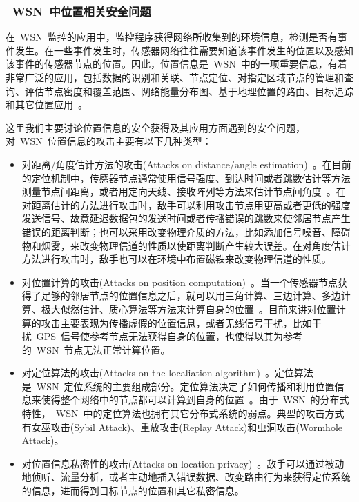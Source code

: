 \documentclass[a4paper,10pt]{article}
\begin{document}
\subsubsection{~WSN~中位置相关安全问题}  

在~WSN~监控的应用中，监控程序获得网络所收集到的环境信息，检测是否有事件发生。在一些事件发生时，传感器网络往往需要知道该事件发生的位置以及感知该事件的传感器节点的位置。因此，位置信息是~WSN~中的一项重要信息，有着非常广泛的应用，包括数据的识别和关联、节点定位、对指定区域节点的管理和查询、评估节点密度和覆盖范围、网络能量分布图、基于地理位置的路由、目标追踪和其它位置应用~\cite{Boukerche2007a,Yick2008}。

这里我们主要讨论位置信息的安全获得及其应用方面遇到的安全问题，对~WSN~位置信息的攻击主要有以下几种类型：

\begin{itemize}

\item 对距离/角度估计方法的攻击(Attacks on distance/angle estimation)~\cite{Boukerche2008}。在目前的定位机制中，传感器节点通常使用信号强度、到达时间或者跳数估计等方法测量节点间距离，或者用定向天线、接收阵列等方法来估计节点间角度~\cite{Boukerche2007a}。在对距离估计的方法进行攻击时，敌手可以利用攻击节点用更高或者更低的强度发送信号、故意延迟数据包的发送时间或者传播错误的跳数来使邻居节点产生错误的距离判断；也可以采用改变物理介质的方法，比如添加信号噪音、障碍物和烟雾，来改变物理信道的性质以使距离判断产生较大误差。在对角度估计方法进行攻击时，敌手也可以在环境中布置磁铁来改变物理信道的性质。

\item 对位置计算的攻击(Attacks on position computation)~\cite{Boukerche2008}。当一个传感器节点获得了足够的邻居节点的位置信息之后，就可以用三角计算、三边计算、多边计算、极大似然估计、质心算法等方法来计算自身的位置~\cite{Boukerche2007a}。目前来讲对位置计算的攻击主要表现为传播虚假的位置信息，或者无线信号干扰，比如干扰~GPS~信号使参考节点无法获得自身的位置，也使得以其为参考的~WSN~节点无法正常计算位置。

\item 对定位算法的攻击(Attacks on the localiation algorithm)~\cite{Boukerche2008}。定位算法是~WSN~定位系统的主要组成部分。定位算法决定了如何传播和利用位置信息来使得整个网络中的节点都可以计算到自身的位置~\cite{Boukerche2007a}。由于~WSN~的分布式特性，~WSN~中的定位算法也拥有其它分布式系统的弱点。典型的攻击方式有女巫攻击(Sybil Attack)、重放攻击(Replay Attack)和虫洞攻击(Wormhole Attack)。

\item 对位置信息私密性的攻击(Attacks on location privacy)~\cite{Ozturk2004, Gruteser2003}。敌手可以通过被动地侦听、流量分析，或者主动地插入错误数据、改变路由行为来获得定位系统的信息，进而得到目标节点的位置和其它私密信息。

\end{itemize}
\end{document}
